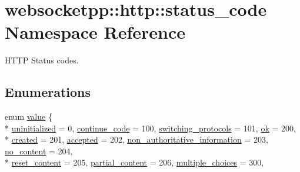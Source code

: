\hypertarget{namespacewebsocketpp_1_1http_1_1status__code}{}\section{websocketpp\+:\+:http\+:\+:status\+\_\+code Namespace Reference}
\label{namespacewebsocketpp_1_1http_1_1status__code}


H\+T\+T\+P Status codes.  


\subsection*{Enumerations}
\begin{DoxyCompactItemize}
\item 
enum \hyperlink{namespacewebsocketpp_1_1http_1_1status__code_ae0d61c309e053ee5673517b54e2886c6}{value} \{ \\*
\hyperlink{namespacewebsocketpp_1_1http_1_1status__code_ae0d61c309e053ee5673517b54e2886c6a462538a8920c099c84c83a51edbd41f0}{uninitialized} = 0, 
\hyperlink{namespacewebsocketpp_1_1http_1_1status__code_ae0d61c309e053ee5673517b54e2886c6a0b89b2fd1d632e0d182822961d8235ee}{continue\+\_\+code} = 100, 
\hyperlink{namespacewebsocketpp_1_1http_1_1status__code_ae0d61c309e053ee5673517b54e2886c6af8fdb6ffaa8898b9a69112d3dd8f0bfc}{switching\+\_\+protocols} = 101, 
\hyperlink{namespacewebsocketpp_1_1http_1_1status__code_ae0d61c309e053ee5673517b54e2886c6a289caa931313b2f373b33032e3661733}{ok} = 200, 
\\*
\hyperlink{namespacewebsocketpp_1_1http_1_1status__code_ae0d61c309e053ee5673517b54e2886c6aadc1c4697ea26f9d64465dcf50930193}{created} = 201, 
\hyperlink{namespacewebsocketpp_1_1http_1_1status__code_ae0d61c309e053ee5673517b54e2886c6a641d5b24273b4f10e32306890043ddb4}{accepted} = 202, 
\hyperlink{namespacewebsocketpp_1_1http_1_1status__code_ae0d61c309e053ee5673517b54e2886c6ae8ce0d4db4c96784c67d22b913f39407}{non\+\_\+authoritative\+\_\+information} = 203, 
\hyperlink{namespacewebsocketpp_1_1http_1_1status__code_ae0d61c309e053ee5673517b54e2886c6a0fc20864485daff90258a0a0a25df8c5}{no\+\_\+content} = 204, 
\\*
\hyperlink{namespacewebsocketpp_1_1http_1_1status__code_ae0d61c309e053ee5673517b54e2886c6a4a4b666afb9df1119ab0c3d24c34e566}{reset\+\_\+content} = 205, 
\hyperlink{namespacewebsocketpp_1_1http_1_1status__code_ae0d61c309e053ee5673517b54e2886c6abbb4ecddc40c99df0cf7d417b8197748}{partial\+\_\+content} = 206, 
\hyperlink{namespacewebsocketpp_1_1http_1_1status__code_ae0d61c309e053ee5673517b54e2886c6a27d4eeef25484b6c05a38bf97880afbd}{multiple\+\_\+choices} = 300, 

\end{DoxyCompactItemize}
